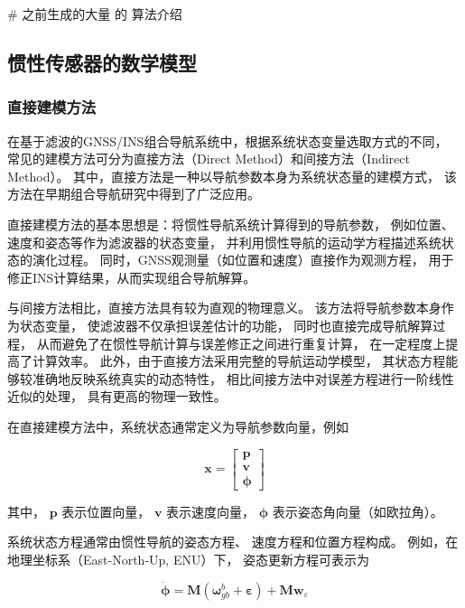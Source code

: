 # 之前生成的大量 的 算法介绍 

\subsection{惯性传感器的数学模型}

\subsubsection{直接建模方法}

在基于滤波的GNSS/INS组合导航系统中，根据系统状态变量选取方式的不同，
常见的建模方法可分为直接方法（Direct Method）和间接方法（Indirect Method）。
其中，直接方法是一种以导航参数本身为系统状态量的建模方式，
该方法在早期组合导航研究中得到了广泛应用。

直接建模方法的基本思想是：将惯性导航系统计算得到的导航参数，
例如位置、速度和姿态等作为滤波器的状态变量，
并利用惯性导航的运动学方程描述系统状态的演化过程。
同时，GNSS观测量（如位置和速度）直接作为观测方程，
用于修正INS计算结果，从而实现组合导航解算。

与间接方法相比，直接方法具有较为直观的物理意义。
该方法将导航参数本身作为状态变量，
使滤波器不仅承担误差估计的功能，
同时也直接完成导航解算过程，
从而避免了在惯性导航计算与误差修正之间进行重复计算，
在一定程度上提高了计算效率。
此外，由于直接方法采用完整的导航运动学模型，
其状态方程能够较准确地反映系统真实的动态特性，
相比间接方法中对误差方程进行一阶线性近似的处理，
具有更高的物理一致性。 \cite{HU2018755}

在直接建模方法中，系统状态通常定义为导航参数向量，例如

\begin{equation}
\mathbf{x}
=
\begin{bmatrix}
\boldsymbol{p} \\
\boldsymbol{v} \\
\boldsymbol{\phi}
\end{bmatrix}
\end{equation}

其中，
$\boldsymbol{p}$ 表示位置向量，
$\boldsymbol{v}$ 表示速度向量，
$\boldsymbol{\phi}$ 表示姿态角向量（如欧拉角）。

系统状态方程通常由惯性导航的姿态方程、
速度方程和位置方程构成。
例如，在地理坐标系（East-North-Up, ENU）下，
姿态更新方程可表示为

\begin{equation}
\dot{\boldsymbol{\phi}}
=
\mathbf{M}
\left(
\boldsymbol{\omega}_{gb}^{b}
+
\boldsymbol{\varepsilon}
\right)
+
\mathbf{M}
\boldsymbol{w}_{\varepsilon}
\end{equation}

